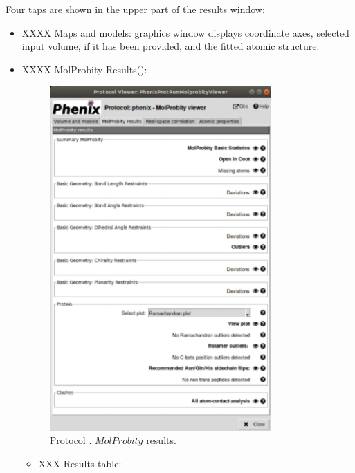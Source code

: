 \begin{itemize}
   Four taps are shown in the upper part of the results window:
   \begin{itemize}
     \item XXXX Maps and models:
     \chimera graphics window displays coordinate axes, selected input volume, if it has been provided, and the fitted atomic structure.
     \item XXXX MolProbity Results():
        \begin{figure}[H]
         \centering 
         \captionsetup{width=.7\linewidth} 
         \includegraphics[width=0.80\textwidth]{Images_appendix/Fig145.pdf}
         \caption{Protocol . $MolProbity$ results.}
         \label{fig:app_protocol_molprobity_3}
        \end{figure}
      \begin{itemize}
        \item XXX Results table:
        

\end{itemize}
\end{itemize}
\end{itemize}
